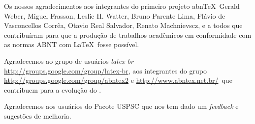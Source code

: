 \begin{agradecimentos}
	Os nossos agradecimentos aos integrantes do primeiro
	projeto abn\TeX\, Gerald Weber, Miguel Frasson, Leslie H. Watter, Bruno Parente Lima, Fl\'avio de Vasconcellos Corr\^ea, Otavio Real
	Salvador, Renato Machnievscz, e a todos que contribuíram para que a produção de trabalhos acad\^emicos em conformidade com
	as normas ABNT com \LaTeX\ fosse possível.
	
	Agradecemos ao grupo de usu\'arios
	\emph{latex-br}  {\url{http://groups.google.com/group/latex-br}}, aos integrantes do grupo
	\emph{\abnTeX}  {\url{http://groups.google.com/group/abntex2}  e \url{http://www.abntex.net.br/}}~que contribuem para a evolução do \abnTeX.
	
	Agradecemos aos usu\'arios do Pacote USPSC que nos tem dado um \textit{feedback} e sugestões de melhoria. 
	
\end{agradecimentos}

